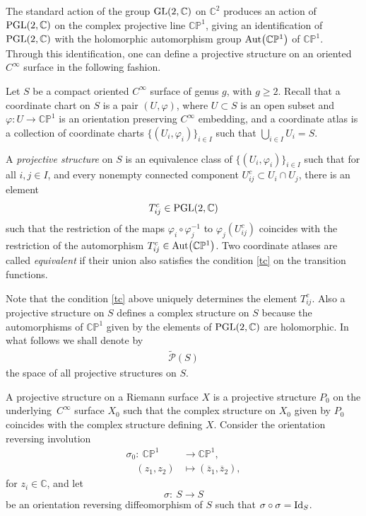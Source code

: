\documentclass[10pt,a4paper]{amsart}
\numberwithin{equation}{section}
\begin{document}
The standard action of the group ${\rm GL}(2,{\mathbb C})$ on ${\mathbb C}^2$ produces an action of
${\rm PGL}(2,{\mathbb C})$ on the complex projective line ${\mathbb C}{\mathbb P}^1$, giving
an identification of ${\rm PGL}(2,{\mathbb C})$ with the holomorphic automorphism group ${\rm Aut}
\bigl({\mathbb C}{\mathbb P}^1\bigr)$ of ${\mathbb C}{\mathbb P}^1$. Through this identification, one can define
a projective structure on an oriented $C^\infty$ surface in the following fashion.

Let $S$ be a compact oriented $C^\infty$ surface of genus $g$, with $g \geq 2$.
Recall that a
coordinate chart on $S$ is a pair $(U, \varphi)$, where $U \subset S$ is an open
subset and $\varphi\colon U \longrightarrow {\mathbb C}{\mathbb P}^1$ is an orientation
preserving $C^\infty$ embedding, and a coordinate atlas is a collection of coordinate charts $\{(U_i,
\varphi_i)\}_{i\in I}$ such that $\bigcup_{i\in I} U_i = S$.

\begin{Definition}
A {\it projective structure} on $S$ is an equivalence class of %
$\{(U_i,\allowbreak \varphi_i)\}_{i\in I}$ such that for all $i, j \in I$, and every nonempty
connected component $U^c_{ij} \subset U_i\cap U_j$, there is an
element
\begin{equation}\label{tc}
T^c_{ij} \in {\rm PGL}(2,{\mathbb C})
\end{equation}
such that the restriction of the maps $\varphi_i\circ \varphi^{-1}_j$ to $\varphi_j(U^c_{ij})$
coincides with the restriction of the automorphism $T^c_{ij} \in {\rm Aut}\bigl({\mathbb C}{\mathbb P}^1\bigr)$. Two
coordinate atlases are called {\it equivalent} if
their union also satisfies the condition \eqref{tc} on the transition functions.
\end{Definition}

{\samepage Note that the condition \eqref{tc} above uniquely
determines the element $T^c_{ij}$. Also a projective structure on $S$ defines
a complex structure on $S$ because the automorphisms of ${\mathbb C}{\mathbb P}^1$ given by the
elements of ${\rm PGL}(2,{\mathbb C})$ are holomorphic.
In what follows we shall denote by
\begin{gather}\label{e0}
\widetilde{\mathcal P}(S)
\end{gather}
the space of all projective structures on $S$.}

A projective structure on a Riemann surface $X$ is a projective structure $P_0$ on the
underlying~$C^\infty$ surface $X_0$ such that the complex structure on $X_0$ given by $P_0$
coincides with the complex structure defining $X$. Consider the orientation reversing involution
\begin{align}
\sigma_0\colon\ {\mathbb C}{\mathbb P}^1 &\longrightarrow {\mathbb C}{\mathbb P}^1,\nonumber\\
\quad(z_1, z_2) &\longmapsto (\overline{z}_1, \overline{z}_2),\label{e1}
\end{align}
for $z_i \in \mathbb C$, and let
\begin{equation}\label{e2}
\sigma\colon\ S \longrightarrow S
\end{equation}
be an orientation reversing diffeomorphism of $S$ such that $\sigma\circ\sigma = {\rm Id}_S$.
\end{document}
